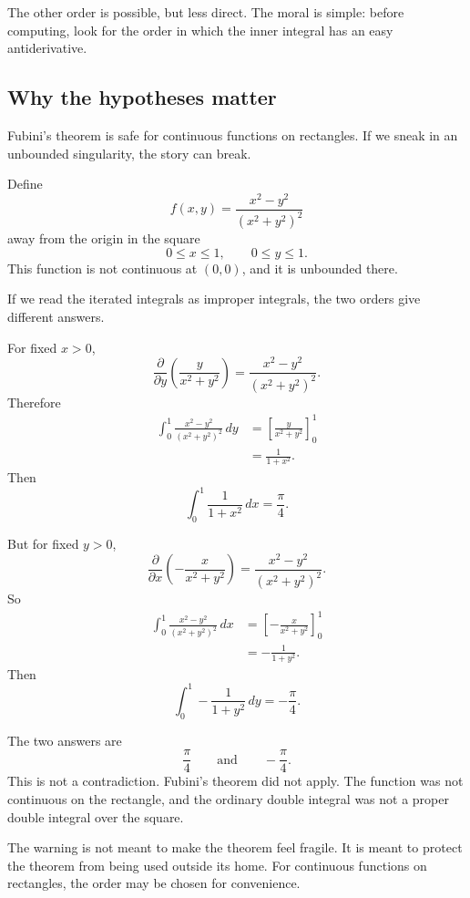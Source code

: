 The other order is possible, but less direct.  The moral is simple: before computing,
look for the order in which the inner integral has an easy antiderivative.

\subsection{Why the hypotheses matter}

Fubini's theorem is safe for continuous functions on rectangles.  If we sneak in an
unbounded singularity, the story can break.

Define
\[
    f(x,y)
    =
    \frac{x^2-y^2}{(x^2+y^2)^2}
\]
away from the origin in the square
\[
    0\le x\le1,
    \qquad
    0\le y\le1.
\]
This function is not continuous at \((0,0)\), and it is unbounded there.

If we read the iterated integrals as improper integrals, the two orders give different
answers.

For fixed \(x>0\),
\[
    \frac{\partial}{\partial y}
    \left(
        \frac{y}{x^2+y^2}
    \right)
    =
    \frac{x^2-y^2}{(x^2+y^2)^2}.
\]
Therefore
\[
\begin{aligned}
    \int_0^1
    \frac{x^2-y^2}{(x^2+y^2)^2}\,dy
    &=
    \left[
        \frac{y}{x^2+y^2}
    \right]_0^1\\
    &=
    \frac{1}{1+x^2}.
\end{aligned}
\]
Then
\[
    \int_0^1 \frac{1}{1+x^2}\,dx=\frac{\pi}{4}.
\]

But for fixed \(y>0\),
\[
    \frac{\partial}{\partial x}
    \left(
        -\frac{x}{x^2+y^2}
    \right)
    =
    \frac{x^2-y^2}{(x^2+y^2)^2}.
\]
So
\[
\begin{aligned}
    \int_0^1
    \frac{x^2-y^2}{(x^2+y^2)^2}\,dx
    &=
    \left[
        -\frac{x}{x^2+y^2}
    \right]_0^1\\
    &=
    -\frac{1}{1+y^2}.
\end{aligned}
\]
Then
\[
    \int_0^1 -\frac{1}{1+y^2}\,dy=-\frac{\pi}{4}.
\]

The two answers are
\[
    \frac{\pi}{4}
    \qquad\text{and}\qquad
    -\frac{\pi}{4}.
\]
This is not a contradiction.  Fubini's theorem did not apply.  The function was not
continuous on the rectangle, and the ordinary double integral was not a proper double
integral over the square.

The warning is not meant to make the theorem feel fragile.  It is meant to protect the
theorem from being used outside its home.  For continuous functions on rectangles, the
order may be chosen for convenience.

